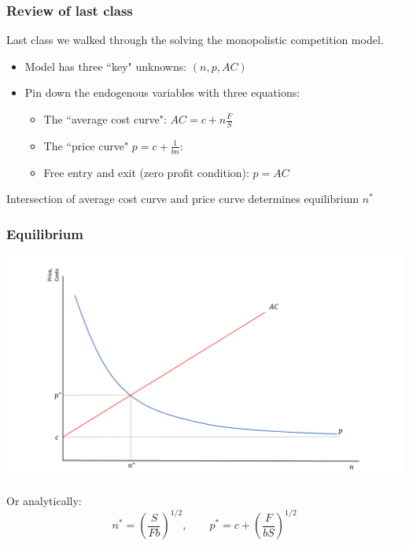 \documentclass{beamer}
\begin{document}
\begin{frame}
\frametitle{Review of last class}

Last class we walked through the solving the monopolistic competition model.
\begin{itemize}
	\item Model has three ``key" unknowns: $(n,p,AC)$
	\item Pin down the endogenous variables with three equations:
		\begin{itemize}
			\item The ``average cost curve": $AC=c+n\frac{F}{S}$
			\item The ``price curve" $p=c+\frac{1}{bn}$:
			\item Free entry and exit (zero profit condition): $p=AC$
		\end{itemize}
\end{itemize}
Intersection of average cost curve and price curve determines equilibrium $n^*$

\end{frame}

\begin{frame}
	\frametitle{Equilibrium}
	\includegraphics[scale=0.3]{SL2_7.pdf}
	
	\scriptsize
	Or analytically:
	\begin{equation}
	n^* =\left(\frac{S}{Fb}\right)^{1/2}, \nonumber \qquad
	p^*=c + \left(\frac{F}{bS}\right)^{1/2}
	\end{equation}
	
	
\end{frame}
\end{document}
